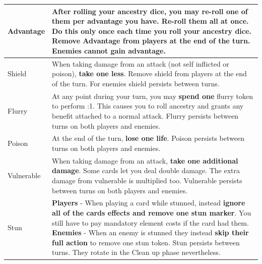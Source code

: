 \begin{longtable}{|p{2.5cm}|p{13.7cm}|}
	\hline
	Advantage \symAdvantage & After rolling your ancestry dice, you may \textbf{re-roll one} of them per advantage you have. Re-roll them all at once. Do this only once each time you roll your ancestry dice. Remove Advantage from players at the end of the turn. Enemies cannot gain advantage.\\
	\hline
	Shield \symShield & When taking damage from an \symAttack attack (not self inflicted or poison), \textbf{take one less}. Remove shield from players at the end of the turn. For enemies shield persists between turns. \\
	\hline
	Flurry \symFlurry & At any point during your turn, you may \textbf{spend one} flurry token to perform \symAttack:1. This causes you to roll ancestry and grants any benefit attached to a normal attack. Flurry persists between turns on both players and enemies. \\
	\hline
	Poison \symPoison & At the end of the turn, \textbf{lose one life}. Poison persists between turns on both players and enemies.\\
	\hline
	Vulnerable \symVulnerable & When taking damage from an attack, \textbf{take one additional damage}. Some cards let you deal double damage. The extra damage from vulnerable is multiplied too. Vulnerable persists between turns on both players and enemies. \\
	\hline
	Stun \symStun & \textbf{Players} - When playing a card while stunned, instead \textbf{ignore all of the cards effects and remove one stun marker}. You still have to pay mandatory element costs if the card had them. \hspace*{12cm} \linebreak \textbf{Enemies} - When an enemy is stunned they instead \textbf{skip their full action} to remove one stun token. Stun persists between turns. They rotate in the Clean up phase nevertheless.\\
	\hline
\end{longtable}